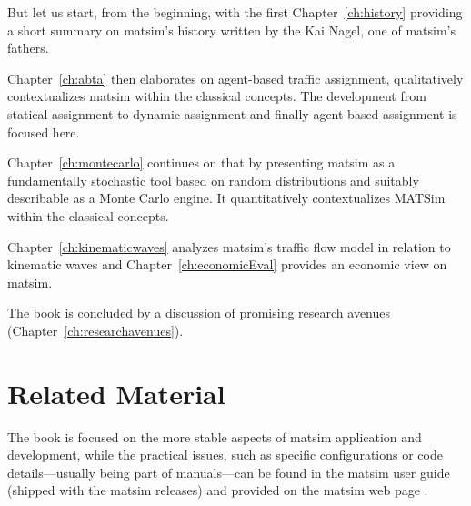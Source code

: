 But let us start, from the beginning, with the first Chapter~\ref{ch:history} providing a short summary on \gls{matsim}'s history written by the Kai Nagel, one of \gls{matsim}'s fathers. 

Chapter~\ref{ch:abta} then elaborates on agent-based traffic assignment, qualitatively contextualizes \gls{matsim} within the classical concepts. The development from statical assignment to dynamic assignment and finally agent-based assignment is focused here.  

Chapter~\ref{ch:montecarlo} continues on that by presenting \gls{matsim} as a fundamentally stochastic tool based on random distributions and suitably describable as a Monte Carlo engine. It quantitatively contextualizes MATSim within the classical concepts.

Chapter~\ref{ch:kinematicwaves} analyzes \gls{matsim}'s traffic flow model in relation to kinematic waves and Chapter~\ref{ch:economicEval} provides an economic view on \gls{matsim}. 

The book is concluded by a discussion of promising research avenues (Chapter~\ref{ch:researchavenues}).

\section*{Related Material}
The book is focused on the more stable aspects of \gls{matsim} application and development, while the practical issues, such as specific configurations or code details---usually being part of manuals---can be found in the \gls{matsim} user guide (shipped with the \gls{matsim} releases) and provided on the \gls{matsim} web page \citep[][]{MATSim_Userguide_2015}.

